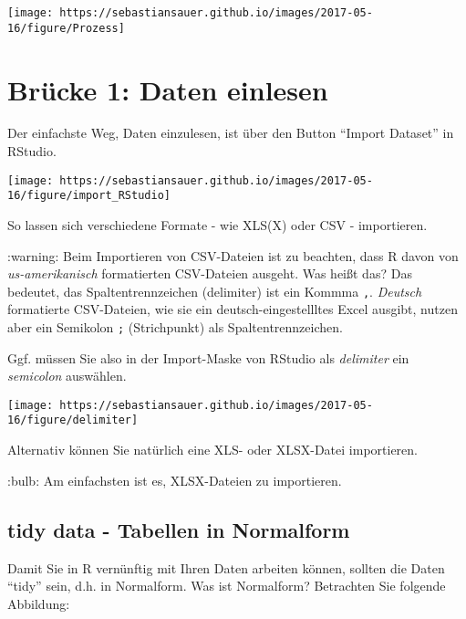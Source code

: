 \documentclass[]{article}
\begin{document}
\begin{center}\texttt{[image: https://sebastiansauer.github.io/images/2017-05-16/figure/Prozess]} \end{center}

\hypertarget{brucke-1-daten-einlesen}{%
\section{Brücke 1: Daten einlesen}\label{brucke-1-daten-einlesen}}

Der einfachste Weg, Daten einzulesen, ist über den Button ``Import
Dataset'' in RStudio.

\begin{center}\texttt{[image: https://sebastiansauer.github.io/images/2017-05-16/figure/import\_RStudio]} \end{center}

So lassen sich verschiedene Formate - wie XLS(X) oder CSV - importieren.

:warning: Beim Importieren von CSV-Dateien ist zu beachten, dass R davon
von \emph{us-amerikanisch} formatierten CSV-Dateien ausgeht. Was heißt
das? Das bedeutet, das Spaltentrennzeichen (delimiter) ist ein Kommma
\texttt{,}. \emph{Deutsch} formatierte CSV-Dateien, wie sie ein
deutsch-eingestellltes Excel ausgibt, nutzen aber ein Semikolon
\texttt{;} (Strichpunkt) als Spaltentrennzeichen.

Ggf. müssen Sie also in der Import-Maske von RStudio als
\emph{delimiter} ein \emph{semicolon} auswählen.

\begin{center}\texttt{[image: https://sebastiansauer.github.io/images/2017-05-16/figure/delimiter]} \end{center}

Alternativ können Sie natürlich eine XLS- oder XLSX-Datei importieren.

:bulb: Am einfachsten ist es, XLSX-Dateien zu importieren.

\hypertarget{tidy-data---tabellen-in-normalform}{%
\subsection{tidy data - Tabellen in
Normalform}\label{tidy-data---tabellen-in-normalform}}

Damit Sie in R vernünftig mit Ihren Daten arbeiten können, sollten die
Daten ``tidy'' sein, d.h. in Normalform. Was ist Normalform? Betrachten
Sie folgende Abbildung:
\end{document}
